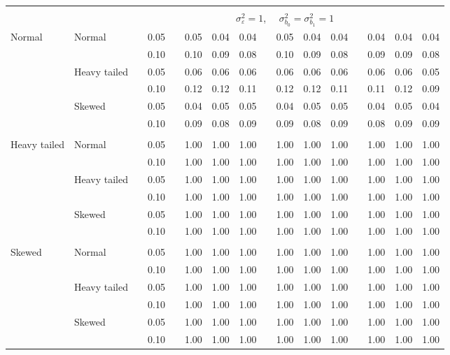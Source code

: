 \begin{table}[ht]
\begin{scriptsize}
\begin{tabular}{ll p{.1cm} c p{.1cm} rrr p{.1cm} rrr p{.1cm} rrr}
&&&&&&&&&&&&&&&\\
& && && \multicolumn{9}{c}{$\sigma_{\varepsilon}^2 = 1$, \ \ $\sigma_{b_0}^2 = \sigma_{b_1}^2 = 1$} \\ \cline{6-16}

\rowcolor{gray!20}Normal       & Normal       && 0.05 &&  0.05 & 0.04 & 0.04 && 0.05 & 0.04 & 0.04 && 0.04 & 0.04 & 0.04 \\ 
\rowcolor{gray!20}             &              && 0.10 &&  0.10 & 0.09 & 0.08 && 0.10 & 0.09 & 0.08 && 0.09 & 0.09 & 0.08 \\ 
\rowcolor{gray!20}             & Heavy tailed && 0.05 &&  0.06 & 0.06 & 0.06 && 0.06 & 0.06 & 0.06 && 0.06 & 0.06 & 0.05 \\ 
\rowcolor{gray!20}             &              && 0.10 &&  0.12 & 0.12 & 0.11 && 0.12 & 0.12 & 0.11 && 0.11 & 0.12 & 0.09 \\ 
\rowcolor{gray!20}             & Skewed       && 0.05 &&  0.04 & 0.05 & 0.05 && 0.04 & 0.05 & 0.05 && 0.04 & 0.05 & 0.04 \\ 
\rowcolor{gray!20}             &              && 0.10 &&  0.09 & 0.08 & 0.09 && 0.09 & 0.08 & 0.09 && 0.08 & 0.09 & 0.09 \\ 
             &&&&&&&&&&&&&&&\\
Heavy tailed & Normal       && 0.05 &&  1.00 & 1.00 & 1.00 && 1.00 & 1.00 & 1.00 && 1.00 & 1.00 & 1.00 \\ 
             &              && 0.10 &&  1.00 & 1.00 & 1.00 && 1.00 & 1.00 & 1.00 && 1.00 & 1.00 & 1.00 \\ 
             & Heavy tailed && 0.05 &&  1.00 & 1.00 & 1.00 && 1.00 & 1.00 & 1.00 && 1.00 & 1.00 & 1.00 \\ 
             &              && 0.10 &&  1.00 & 1.00 & 1.00 && 1.00 & 1.00 & 1.00 && 1.00 & 1.00 & 1.00 \\ 
             & Skewed       && 0.05 &&  1.00 & 1.00 & 1.00 && 1.00 & 1.00 & 1.00 && 1.00 & 1.00 & 1.00 \\ 
             &              && 0.10 &&  1.00 & 1.00 & 1.00 && 1.00 & 1.00 & 1.00 && 1.00 & 1.00 & 1.00 \\
             &&&&&&&&&&&&&&&\\ 
Skewed       & Normal       && 0.05 &&  1.00 & 1.00 & 1.00 && 1.00 & 1.00 & 1.00 && 1.00 & 1.00 & 1.00 \\ 
             &              && 0.10 &&  1.00 & 1.00 & 1.00 && 1.00 & 1.00 & 1.00 && 1.00 & 1.00 & 1.00 \\ 
             & Heavy tailed && 0.05 &&  1.00 & 1.00 & 1.00 && 1.00 & 1.00 & 1.00 && 1.00 & 1.00 & 1.00 \\ 
             &              && 0.10 &&  1.00 & 1.00 & 1.00 && 1.00 & 1.00 & 1.00 && 1.00 & 1.00 & 1.00 \\ 
             & Skewed       && 0.05 &&  1.00 & 1.00 & 1.00 && 1.00 & 1.00 & 1.00 && 1.00 & 1.00 & 1.00 \\ 
             &              && 0.10 &&  1.00 & 1.00 & 1.00 && 1.00 & 1.00 & 1.00 && 1.00 & 1.00 & 1.00 \\ 



\end{tabular}
\end{scriptsize}
\end{table}
